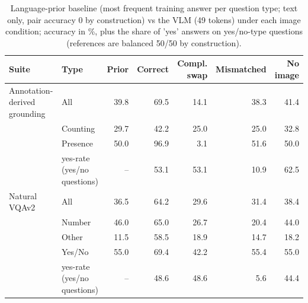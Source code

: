 \begin{table}[t]
\centering
\small
\caption{Language-prior baseline (most frequent training answer per question type; text only, pair accuracy 0 by construction) vs the VLM (49 tokens) under each image condition; accuracy in \%, plus the share of 'yes' answers on yes/no-type questions (references are balanced 50/50 by construction).}
\label{tab:t2_t8_prior_and_bias_compress49}
\begin{tabular}{llrrrrr}
\toprule
Suite & Type & Prior & Correct & Compl. swap & Mismatched & No image \\
\midrule
Annotation-derived grounding & All & 39.8 & 69.5 & 14.1 & 38.3 & 41.4 \\
 & Counting & 29.7 & 42.2 & 25.0 & 25.0 & 32.8 \\
 & Presence & 50.0 & 96.9 & 3.1 & 51.6 & 50.0 \\
 & yes-rate (yes/no questions) & -- & 53.1 & 53.1 & 10.9 & 62.5 \\
Natural VQAv2 & All & 36.5 & 64.2 & 29.6 & 31.4 & 38.4 \\
 & Number & 46.0 & 65.0 & 26.7 & 20.4 & 44.0 \\
 & Other & 11.5 & 58.5 & 18.9 & 14.7 & 18.2 \\
 & Yes/No & 55.0 & 69.4 & 42.2 & 55.4 & 55.0 \\
 & yes-rate (yes/no questions) & -- & 48.6 & 48.6 & 5.6 & 44.4 \\
\bottomrule
\end{tabular}
\end{table}
